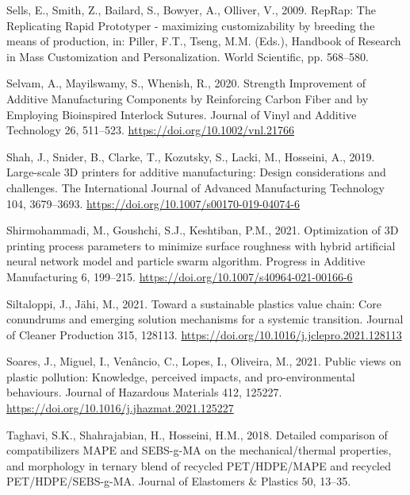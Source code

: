 \documentclass[
  12pt,
  number,
  review]{elsarticle}
\newlength{\cslhangindent}
\newlength{\cslentryspacingunit} %
\newenvironment{CSLReferences}[2] %
 {%
  \setlength{\parindent}{0pt}
  \ifodd #1
  \let\oldpar\par
  \def\par{\hangindent=\cslhangindent\oldpar}
  \fi
  \setlength{\parskip}{#2\cslentryspacingunit}
 }%
 {}
\begin{document}
\begin{CSLReferences}{1}{0}
\leavevmode{}%
Sells, E., Smith, Z., Bailard, S., Bowyer, A., Olliver, V., 2009.
{RepRap}: {The Replicating Rapid Prototyper} - maximizing
customizability by breeding the means of production, in: Piller, F.T.,
Tseng, M.M. (Eds.), Handbook of {Research} in {Mass Customization} and
{Personalization}. {World Scientific}, pp. 568--580.

\leavevmode{}%
Selvam, A., Mayilswamy, S., Whenish, R., 2020. Strength {Improvement} of
{Additive Manufacturing Components} by {Reinforcing Carbon Fiber} and by
{Employing Bioinspired Interlock Sutures}. Journal of Vinyl and Additive
Technology 26, 511--523. \url{https://doi.org/10.1002/vnl.21766}

\leavevmode{}%
Shah, J., Snider, B., Clarke, T., Kozutsky, S., Lacki, M., Hosseini, A.,
2019. Large-scale {3D} printers for additive manufacturing: Design
considerations and challenges. The International Journal of Advanced
Manufacturing Technology 104, 3679--3693.
\url{https://doi.org/10.1007/s00170-019-04074-6}

\leavevmode{}%
Shirmohammadi, M., Goushchi, S.J., Keshtiban, P.M., 2021. Optimization
of {3D} printing process parameters to minimize surface roughness with
hybrid artificial neural network model and particle swarm algorithm.
Progress in Additive Manufacturing 6, 199--215.
\url{https://doi.org/10.1007/s40964-021-00166-6}

\leavevmode{}%
Siltaloppi, J., Jähi, M., 2021. Toward a sustainable plastics value
chain: {Core} conundrums and emerging solution mechanisms for a systemic
transition. Journal of Cleaner Production 315, 128113.
\url{https://doi.org/10.1016/j.jclepro.2021.128113}

\leavevmode{}%
Soares, J., Miguel, I., Venâncio, C., Lopes, I., Oliveira, M., 2021.
Public views on plastic pollution: {Knowledge}, perceived impacts, and
pro-environmental behaviours. Journal of Hazardous Materials 412,
125227. \url{https://doi.org/10.1016/j.jhazmat.2021.125227}

\leavevmode{}%
Taghavi, S.K., Shahrajabian, H., Hosseini, H.M., 2018. Detailed
comparison of compatibilizers MAPE and SEBS-g-MA on the
mechanical/thermal properties, and morphology in ternary blend of
recycled PET/HDPE/MAPE and recycled PET/HDPE/SEBS-g-MA. Journal of
Elastomers \& Plastics 50, 13--35.


\end{CSLReferences}
\end{document}
